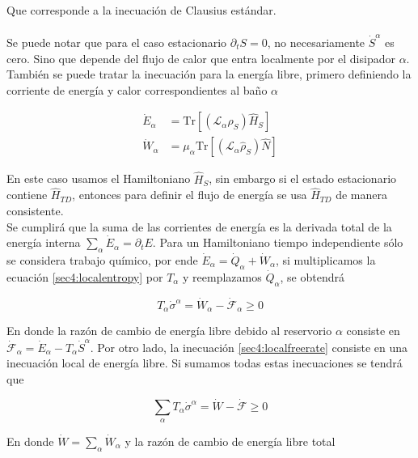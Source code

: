 Que corresponde a la inecuación de Clausius estándar.\\
\\
Se puede notar que para el caso estacionario $\partial_{t}S = 0$, no necesariamente $\dot{S}^{\alpha}$ es cero. Sino que depende del flujo de calor que entra localmente por el disipador $\alpha$. También se puede tratar la inecuación para la energía libre, primero definiendo la corriente de energía y calor correspondientes al baño $\alpha$

\begin{align*}
    \dot{E}_{\alpha} & = \text{Tr}[ (\mathcal{L}_{\alpha} \hat{\rho}_{S}) \hat{H}_{S}] \\
    \dot{W}_{\alpha} & = \mu_{\alpha}\text{Tr}[ (\mathcal{L}_{\alpha} \hat{\rho}_{S}) \hat{N}]
\end{align*}

En este caso usamos el Hamiltoniano $\hat{H}_{S}$, sin embargo si el estado estacionario contiene $\hat{H}_{TD}$, entonces para definir el flujo de energía se usa $\hat{H}_{TD}$ de manera consistente.\\
 Se cumplirá que la suma de las corrientes de energía es la derivada total de la energía interna $\sum_{\alpha} \dot{E}_{\alpha} = \partial_{t}E$. Para un Hamiltoniano tiempo independiente sólo se considera trabajo químico, por ende $\dot{E}_{\alpha} = \dot{Q}_{\alpha} + \dot{W}_{\alpha}$, si multiplicamos la ecuación \ref{sec4:localentropy} por $T_{\alpha}$ y reemplazamos $\dot{Q}_{\alpha}$, se obtendrá

\begin{equation}
    T_{\alpha} \dot{\sigma}^{\alpha} = \dot{W}_{\alpha} - \dot{\mathcal{F}}_{\alpha} \geq 0
\label{sec4:localfreerate}
\end{equation}

En donde la razón de cambio de energía libre debido al reservorio $\alpha$ consiste en $\dot{\mathcal{F}}_{\alpha} = \dot{E}_{\alpha} - T_{\alpha}\dot{S}^{\alpha}$. Por otro lado, la inecuación \ref{sec4:localfreerate} consiste en una inecuación local de energía libre. Si sumamos todas estas inecuaciones se tendrá que

\begin{equation}
    \sum_{\alpha}T_{\alpha} \dot{\sigma}^{\alpha} = \dot{W} - \dot{\mathcal{F}} \geq 0
\label{sec4:freeratefinal}
\end{equation}

En donde $\dot{W} = \sum_{\alpha}\dot{W}_{\alpha}$ y la razón de cambio de energía libre total

